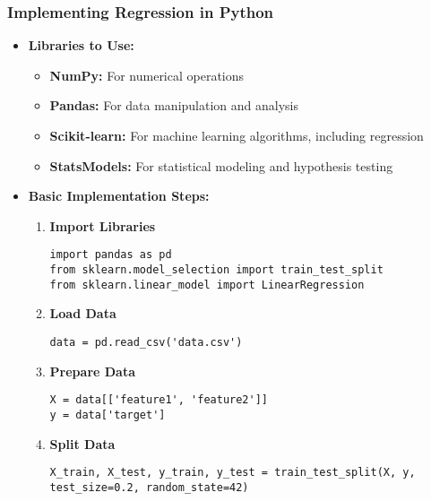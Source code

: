 \documentclass[aspectratio=169]{beamer}
\begin{document}
\begin{frame}[fragile]
    \frametitle{Implementing Regression in Python}
    \begin{itemize}
        \item \textbf{Libraries to Use:}
        \begin{itemize}
            \item \textbf{NumPy:} For numerical operations
            \item \textbf{Pandas:} For data manipulation and analysis
            \item \textbf{Scikit-learn:} For machine learning algorithms, including regression
            \item \textbf{StatsModels:} For statistical modeling and hypothesis testing
        \end{itemize}
        
        \item \textbf{Basic Implementation Steps:}
        \begin{enumerate}
            \item \textbf{Import Libraries}
            \begin{lstlisting}
import pandas as pd
from sklearn.model_selection import train_test_split
from sklearn.linear_model import LinearRegression
            \end{lstlisting}
            
            \item \textbf{Load Data}
            \begin{lstlisting}
data = pd.read_csv('data.csv')
            \end{lstlisting}
            
            \item \textbf{Prepare Data}
            \begin{lstlisting}
X = data[['feature1', 'feature2']]
y = data['target']
            \end{lstlisting}
        
            \item \textbf{Split Data}
            \begin{lstlisting}
X_train, X_test, y_train, y_test = train_test_split(X, y, test_size=0.2, random_state=42)
            \end{lstlisting}
        \end{enumerate}
    \end{itemize}
\end{frame}
\end{document}
